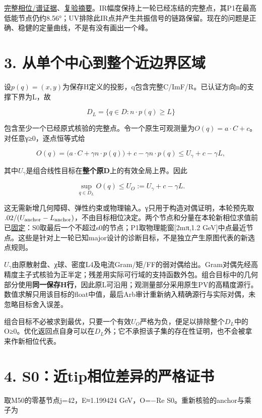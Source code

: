 \documentclass[
  10pt,
  a4paper,
]{article}
\begin{document}
\href{../refined_phases/phases.json}{完整相位/谱证据}、\href{../REFINEMENT_SUMMARY.json}{复验摘要}。IR幅度保持上一轮已经冻结的完整点，其P1在最高低能节点仍约8.56°；UV排除此IR点并产生共振信号的链路保留。现在的问题是正确、稳健的定量曲线，不是有没有画出一个峰。

\section{3.
从单个中心到整个近边界区域}\label{ux4eceux5355ux4e2aux4e2dux5fc3ux5230ux6574ux4e2aux8fd1ux8fb9ux754cux533aux57df}

设\(p(q)=(x,y)\)为保存H定义的投影，q包含完整C/ImF/R。已认证方向n的支撑下界为L，故

\[D_L=\{q\in D:n\cdot p(q)\ge L\}\]

包含至少一个已经原式核验的完整点。令一个原生可观测量为\(O(q)=a\cdot C+c\)。对任意γ≥0，逐点恒等式给

\[O(q)=\big(a\cdot C+\gamma n\cdot p(q)\big)+c-\gamma n\cdot p(q)
\le U_\gamma+c-\gamma L,\]

其中\(U_\gamma\)是组合线性目标在\textbf{整个原D}上的有效全局上界。因此

\[\boxed{\sup_{q\in D_L}O(q)\le U_O:=U_\gamma+c-\gamma L.}\]

这无需新增几何障碍、弹性约束或物理输入。γ只用于构造对偶证明，本轮预先取\(.02/(U_{\rm anchor}-L_{\rm anchor})\)，不由目标相位决定。两个节点和分量在本轮新相位求值前已\href{../SUPPORT_PROBE_DESIGN_ZH.md}{固定}：S0取最后一个不超过s0的节点；P1取物理能窗{[}2mπ,1.2
GeV{]}中点最近节点。这些是针对上一轮已知major设计的诊断目标，不是独立产生原图代表的新选点规则。

\(U_\gamma\)由原散射盘、χ球、密度L4及电流Gram/矩/FF的弱对偶给出。Gram对偶先经高精度主子式核验为正半定；残差用实际可行域的支持函数外包。组合目标中的几何部分使用\textbf{同一保存H行}，因此原L可沿用；观测量部分采用原生PV的高精度源行。数值求解只用该目标的float中值，最后Arb审计重新纳入精确源行与实际对偶，未忽略目标舍入误差。

组合目标不必被求到最优，只要一个有效\(U_O\)严格为负，便足以排除整个\(D_L\)中的O≥0。优化返回点自身可以在\(D_L\)外；它不承担该子集的存在性证明，也不会被拿来作新相位代表。

\section{4.
S0：近tip相位差异的严格证书}\label{s0ux8fd1tipux76f8ux4f4dux5deeux5f02ux7684ux4e25ux683cux8bc1ux4e66}

取M50的零基节点j=42，E≈1.199424 GeV，O=−Re S0。重新核验的anchor与乘子为
\end{document}
